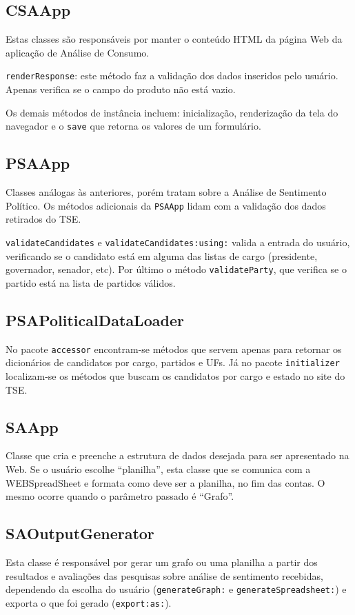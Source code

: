 \subsection{CSAApp}
Estas classes são responsáveis por manter o conteúdo HTML da página Web da aplicação de Análise de Consumo.

\texttt{renderResponse}: este método faz a validação dos dados inseridos pelo usuário. Apenas verifica se o campo do produto não está vazio.

Os demais métodos de instância incluem: inicialização, renderização da tela do navegador e o \texttt{save} que retorna os valores de um formulário.

\subsection{PSAApp}
Classes análogas às anteriores, porém tratam sobre a Análise de Sentimento Político. Os métodos adicionais da \texttt{PSAApp} lidam com a validação dos dados retirados do TSE.

\texttt{validateCandidates} e \texttt{validateCandidates:using:} valida a entrada do usuário, verificando se o candidato está em alguma das listas de cargo (presidente, governador, senador, etc). Por último o método \texttt{validateParty}, que verifica se o partido está na lista de partidos válidos.

\subsection{PSAPoliticalDataLoader}
No pacote \texttt{accessor} encontram-se métodos que servem apenas para retornar os dicionários de candidatos por cargo, partidos e UFs. Já no pacote \texttt{initializer} localizam-se os métodos que buscam os candidatos por cargo e estado no site do TSE.

\subsection{SAApp}
Classe que cria e preenche a estrutura de dados desejada para ser apresentado na Web. Se o usuário escolhe ``planilha'', esta classe que se comunica com a WEBSpreadSheet e formata como deve ser a planilha, no fim das contas. O mesmo ocorre quando o parâmetro passado é ``Grafo''.

\subsection{SAOutputGenerator}
Esta classe é responsável por gerar um grafo ou uma planilha a partir dos resultados e avaliações das pesquisas sobre análise de sentimento recebidas, dependendo da escolha do usuário (\texttt{generateGraph:} e \texttt{generateSpreadsheet:}) e exporta o que foi gerado (\texttt{export:as:}).

